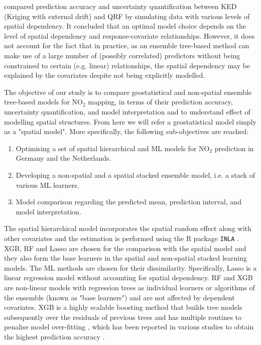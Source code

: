 \documentclass{article}
\begin{document}
\cite{fouedjio2019exploring} compared prediction accuracy and uncertainty quantification between KED (Kriging with external drift) and QRF by simulating data with various levels of spatial dependency. It concluded that an optimal model choice depends on the level of spatial dependency and response-covariate relationships. However, it does not account for the fact that in practice, as an ensemble tree-based method can make use of a large number of (possibly correlated) predictors without being constrained to certain (e.g. linear) relationships, the spatial dependency may be explained by the covariates despite not being explicitly modelled. 

 The objective of our study is to compare geostatistical and non-spatial ensemble tree-based models for NO$_2$ mapping, in terms of their prediction accuracy, uncertainty quantification, and model interpretation and to understand effect of modelling spatial structures. From here we will refer a geostatistical model simply as a "spatial model". More specifically, the following sub-objectives are reached:

\begin{enumerate}
    \item Optimising a set of spatial hierarchical and ML models for NO$_2$ prediction in Germany and the Netherlands.
    
    \item Developing a non-spatial and a  spatial stacked ensemble model, i.e. a stack of various ML learners.
    \item Model comparison regarding the predicted mean, prediction interval, and model interpretation.  
\end{enumerate}

 
 
The spatial hierarchical model incorporates the spatial random effect along with other covariates and the estimation is performed using the R package \texttt{INLA} \citep{rue2009approximate,martins2013bayesian}. XGB, RF and Lasso are chosen for the comparison with the  spatial model and they also form the base learners in the  spatial and non-spatial stacked learning models. The ML methods are chosen for their dissimilarity. Specifically, Lasso is a linear regression model without accounting for spatial dependency. RF and XGB are non-linear models with regression trees as individual learners or algorithms of the ensemble (known as "base learners") and are not affected by dependent covariates. XGB is a highly scalable boosting method that builds tree models subsequently over the residuals of previous trees and has multiple routines to penalise model over-fitting \citep{xgboost}, which has been reported in various studies to obtain the highest prediction accuracy \cite{luglobal}. 
\end{document}
